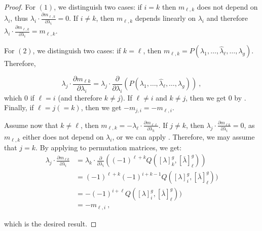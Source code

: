 \documentclass[11pt,letterpaper,english]{amsart}
\numberwithin{equation}{subsection}
\numberwithin{equation}{section}
\theoremstyle{plain}
\theoremstyle{remark}
\begin{document}
\begin{proof}
   For $(1)$, we distinguish two cases: if $i=k$ then $m_{\ell,k}$ does not depend on $\lambda_i$, thus $\lambda_i\cdot\frac{\partial m_{\ell,k}}{\partial\lambda_i}=0$. If $i\neq k$, then $m_{\ell,k}$ depends linearly on $\lambda_i$ and therefore $\lambda_i\cdot\frac{\partial m_{\ell,k}}{\partial\lambda_i}=m_{\ell,k}$.
   
    For $(2)$, we distinguish two cases: if $k=\ell$, then $m_{\ell,k}=P(\lambda_1,\ldots,\widehat{\lambda}_\ell,\ldots,\lambda_g)$. Therefore,

    \[\lambda_j\cdot \frac{\partial m_{\ell k}}{\partial \lambda_i}=\lambda_j\cdot \frac{\partial }{\partial \lambda_i}(P(\lambda_1,\ldots,\widehat{\lambda}_\ell,\ldots,\lambda_g))~,\]  which $0$ if $\ell=i$ (and therefore $k\neq j$). If $\ell \neq i$ and $k\neq j$, then we get $0$ by . Finally, if $\ell=j(=k)$, then we get $-m_{j,i}=-m_{\ell,i}$.

    Assume now that $k\neq \ell$, then $m_{\ell,k}=-\lambda_{\ell}\cdot\frac{\partial m_{\ell\ell}}{\partial \lambda_k}$. If $j\neq k$, then $\lambda_j\cdot \frac{\partial m_{\ell k}}{\partial \lambda_i}=0$, as $m_{\ell,k}$ either does not depend on $\lambda_i$, or we can apply .
    Therefore, we may assume that $j=k$. By applying   to permutation matrices, we get:
    \begin{align*}
        \lambda_j\cdot \frac{\partial m_{\ell k}}{\partial \lambda_i}&=\lambda_k\cdot \frac{\partial }{\partial \lambda_i}((-1)^{\ell+k}Q([\lambda]^g_k,[\overline \lambda]^g_\ell ))\\
        &= (-1)^{\ell+k}(-1)^{i+k-1}Q([\lambda]^g_i,[\overline \lambda]^g_\ell ))\\
        &=-(-1)^{i+\ell}Q([\lambda]^g_i,[ \overline \lambda]^g_\ell ))\\
        &=-m_{\ell,i}~,
    \end{align*}

    which is the desired result. 

   

\end{proof}
\end{document}
